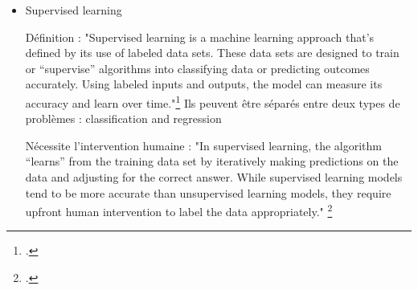 \begin{itemize}
les transformers pour l'analyse d'image : 
"Les transformeurs offrent également certains avantages par rapport aux réseaux de neurones, en particulier pour les données visuelles. Intrinsèquement locaux, les CNN utilisent des convolutions pour traiter successivement les sous-ensembles de données d’entrée.
Par conséquent, les CNN peinent à discerner les dépendances à longue portée, telles que les corrélations entre les mots (dans un texte) ou les pixels (dans une image) qui ne sont pas voisins. Les mécanismes d’attention n’ont pas cette limitation." \footcite{bergmann2025}

\subitem CNN : réseau de neurones convolutif 
Outils de classification : 
"modèles de programmation puissants permettant notamment la reconnaissance d’images en attribuant automatiquement à chaque image fournie en entrée, une étiquette correspondant à sa classe d’appartenance."\footcite{robert2026}
l'un des principaux cas d'usages des CNN est la "reconnaissance d'images". "Dans une moindre mesure, on les utilise aussi pour l’analyse vidéo.". \footcite{robert2026}

Description du fonctionnement d'un CNN appliqué à un corpus d'images : « CNNs learn a hierarchy of filters, which are applied to an input image in order to extract meaningful information from the input. [...] CNNs tend to learn features that resemble Gabor-like edge detectors and color-opponent filters at lower layers [...]. On higher layers of the CNNs, features capture more abstract image content by integrating the lower-layer features. » \footcite{brachmann2017}. A relier avec ResNet : même fonctionnement. 

\item Supervised learning

Définition : 
"Supervised learning is a machine learning approach that’s defined by its use of labeled data sets. These data sets are designed to train or “supervise” algorithms into classifying data or predicting outcomes accurately. Using labeled inputs and outputs, the model can measure its accuracy and learn over time."\footcite{delua2024}
Ils peuvent être séparés entre deux types de problèmes : classification and regression

Nécessite l'intervention humaine : 
"In supervised learning, the algorithm “learns” from the training data set by iteratively making predictions on the data and adjusting for the correct answer. While supervised learning models tend to be more accurate than unsupervised learning models, they require upfront human intervention to label the data appropriately." \footcite{delua2024}


\end{itemize}
